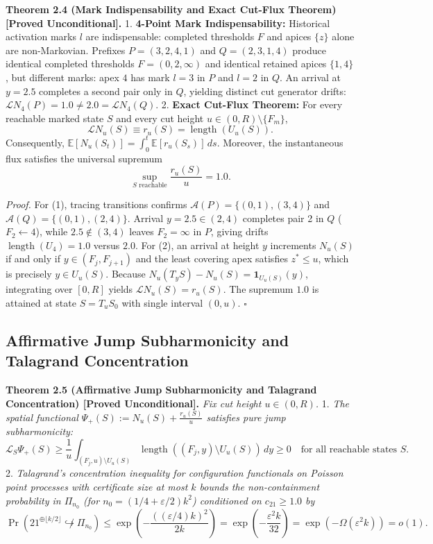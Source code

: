 \documentclass[
  11pt,
]{article}
\begin{document}
\textbf{Theorem 2.4 (Mark Indispensability and Exact Cut-Flux Theorem) [Proved Unconditional].}
1. \textbf{4-Point Mark Indispensability:} Historical activation marks
\(l\) are indispensable: completed thresholds \(F\) and apices \(\{z\}\)
alone are non-Markovian. Prefixes \(P = (3, 2, 4, 1)\) and
\(Q = (2, 3, 1, 4)\) produce identical completed thresholds
\(F = (0, 2, \infty)\) and identical retained apices \(\{1, 4\}\), but
different marks: apex \(4\) has mark \(l=3\) in \(P\) and \(l=2\) in
\(Q\). An arrival at \(y = 2.5\) completes a second pair only in \(Q\),
yielding distinct cut generator drifts:
\(\mathcal{L} N_4(P) = 1.0 \ne 2.0 = \mathcal{L} N_4(Q)\). 2.
\textbf{Exact Cut-Flux Theorem:} For every reachable marked state \(S\)
and every cut height \(u \in (0, R) \setminus \{F_m\}\), \[
   \mathcal{L} N_u(S) \equiv r_u(S) = \operatorname{length}(U_u(S)).
   \] Consequently,
\(\mathbb{E}[N_u(S_t)] = \int_0^t \mathbb{E}[r_u(S_s)] \, ds\).
Moreover, the instantaneous flux satisfies the universal supremum \[
   \sup_{S \text{ reachable}} \frac{r_u(S)}{u} = 1.0.
   \]

\emph{Proof.} For (1), tracing transitions confirms
\(\mathcal{A}(P) = \{(0, 1), (3, 4)\}\) and
\(\mathcal{A}(Q) = \{(0, 1), (2, 4)\}\). Arrival \(y = 2.5 \in (2, 4)\)
completes pair 2 in \(Q\) (\(F_2 \leftarrow 4\)), while
\(2.5 \notin (3, 4)\) leaves \(F_2 = \infty\) in \(P\), giving drifts
\(\operatorname{length}(U_4) = 1.0\) versus \(2.0\). For (2), an arrival
at height \(y\) increments \(N_u(S)\) if and only if
\(y \in (F_j, F_{j+1})\) and the least covering apex satisfies
\(z^* \le u\), which is precisely \(y \in U_u(S)\). Because
\(N_u(T_y S) - N_u(S) = \mathbf{1}_{U_u(S)}(y)\), integrating over
\([0, R]\) yields \(\mathcal{L} N_u(S) = r_u(S)\). The supremum \(1.0\)
is attained at state \(S = T_u S_0\) with single interval \((0, u)\).
\(\square\)

\subsection{Affirmative Jump Subharmonicity and Talagrand Concentration}\label{affirmative-jump-subharmonicity-and-the-boundary-starvation-barrier}

\textbf{Theorem 2.5 (Affirmative Jump Subharmonicity and Talagrand Concentration) [Proved Unconditional].} \emph{Fix cut height \(u \in (0, R)\).} 1.
\emph{The spatial functional \(\Psi_+(S) := N_u(S) + \frac{r_u(S)}{u}\)
satisfies pure jump subharmonicity:} \[
   \mathcal{L}_S \Psi_+(S) \ge \frac{1}{u} \int_{(F_j, u) \setminus U_u(S)} \operatorname{length}\left((F_j, y) \setminus U_u(S)\right) \, dy \ge 0 \quad \text{for all reachable states } S.
   \] 2. \emph{Talagrand's concentration inequality for
configuration functionals on Poisson point processes with certificate
size at most \(k\) bounds the non-containment probability in
\(\Pi_{n_0}\) (for \(n_0 = (1/4+\varepsilon/2)k^2\)) conditioned on \(c_{21} \ge 1.0\) by} \[
   \Pr\left(21^{\oplus \lfloor k/2 \rfloor} \not\hookrightarrow \Pi_{n_0}\right) \le \exp\left(-\frac{((\varepsilon/4)k)^2}{2k}\right) = \exp\left(-\frac{\varepsilon^2 k}{32}\right) = \exp(-\Omega(\varepsilon^2 k)) = o(1).
   \]
\end{document}
